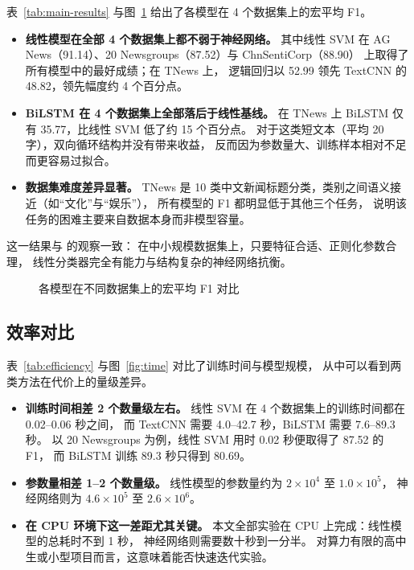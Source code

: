 \documentclass[11pt, a4paper]{ctexart}
\begin{document}
表~\ref{tab:main-results} 与图~\ref{fig:f1} 给出了各模型在 4 个数据集上的宏平均 F1。
\begin{itemize}
  \item \textbf{线性模型在全部 4 个数据集上都不弱于神经网络。}
  其中线性 SVM 在 AG News（91.14）、20 Newsgroups（87.52）与 ChnSentiCorp（88.90）
  上取得了所有模型中的最好成绩；在 TNews 上，
  逻辑回归以 52.99 领先 TextCNN 的 48.82，领先幅度约 4 个百分点。
  \item \textbf{BiLSTM 在 4 个数据集上全部落后于线性基线。}
  在 TNews 上 BiLSTM 仅有 35.77，比线性 SVM 低了约 15 个百分点。
  对于这类短文本（平均 20 字），双向循环结构并没有带来收益，
  反而因为参数量大、训练样本相对不足而更容易过拟合。
  \item \textbf{数据集难度差异显著。}
  TNews 是 10 类中文新闻标题分类，类别之间语义接近（如“文化”与“娱乐”），
  所有模型的 F1 都明显低于其他三个任务，
  说明该任务的困难主要来自数据本身而非模型容量。
\end{itemize}

这一结果与\citet{lin2023linear} 的观察一致：
在中小规模数据集上，只要特征合适、正则化参数合理，
线性分类器完全有能力与结构复杂的神经网络抗衡。



\begin{figure}[htbp]
\centering

\caption{各模型在不同数据集上的宏平均 F1 对比}
\label{fig:f1}
\end{figure}

\subsection{效率对比}

表~\ref{tab:efficiency} 与图~\ref{fig:time} 对比了训练时间与模型规模，
从中可以看到两类方法在代价上的量级差异。

\begin{itemize}
  \item \textbf{训练时间相差 2 个数量级左右。}
  线性 SVM 在 4 个数据集上的训练时间都在 0.02--0.06 秒之间，
  而 TextCNN 需要 4.0--42.7 秒，BiLSTM 需要 7.6--89.3 秒。
  以 20 Newsgroups 为例，线性 SVM 用时 0.02 秒便取得了 87.52 的 F1，
  而 BiLSTM 训练 89.3 秒只得到 80.69。
  \item \textbf{参数量相差 1--2 个数量级。}
  线性模型的参数量约为 $2\times10^4$ 至 $1.0\times10^5$，
  神经网络则为 $4.6\times10^5$ 至 $2.6\times10^6$。
  \item \textbf{在 CPU 环境下这一差距尤其关键。}
  本文全部实验在 CPU 上完成：线性模型的总耗时不到 1 秒，
  神经网络则需要数十秒到一分半。
  对算力有限的高中生或小型项目而言，这意味着能否快速迭代实验。
\end{itemize}
\end{document}
